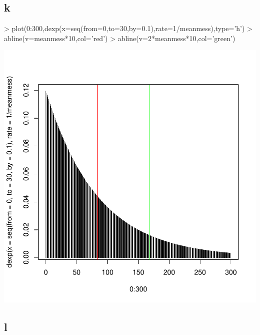 \subsection{k}
\begin{Schunk}
\begin{Sinput}
> plot(0:300,dexp(x=seq(from=0,to=30,by=0.1),rate=1/meanmess),type='h')
> abline(v=meanmess*10,col='red')
> abline(v=2*meanmess*10,col='green')
\end{Sinput}
\end{Schunk}
\includegraphics{sw10_1-012}

\subsection{l}

